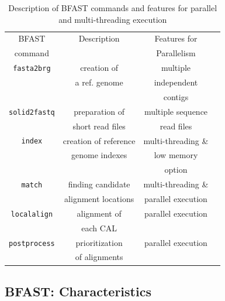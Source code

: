 \documentclass{acm_proc_article-sp}
\begin{document}
\begin{table}
\begin{tabular}{|c|c|c|c|} 
  \hline BFAST & Description & Features for \\ command & & Parallelism
  \\ \hline \hline \texttt{fasta2brg} & creation of & multiple \\ &a ref. genome &
  independent \\ & & contigs \\ \hline
  \texttt{solid2fastq} & preparation of & multiple sequence \\ & short
  read files & read files\\ \hline

\texttt{index} & creation of reference & multi-threading \& \\
& genome indexes  & low memory  \\ 
&&option \\
 
  \hline
\texttt{match} & finding candidate   &  multi-threading \& \\

& alignment locations &  parallel execution \\ \hline
\texttt{localalign} & alignment of&   parallel execution \\
&  each CAL   & \\

  \hline
\texttt{postprocess} & prioritization   &  parallel execution \\ 
& of alignments & \\
\hline


\hline
\end{tabular} \caption{Description of BFAST commands and features for parallel and multi-threading execution}
 \label{table:bfast-summary} 
\end{table}



\subsection{BFAST: Characteristics}
\end{document}
